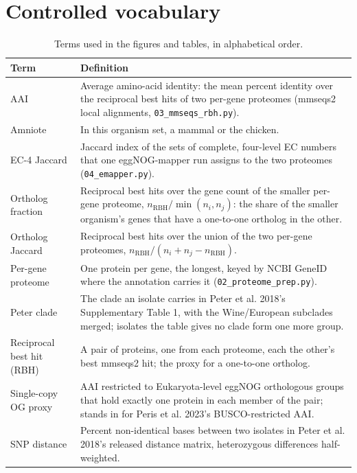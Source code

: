 
\section{Controlled vocabulary}\label{sec:vocab}

\begin{table}[H]\centering\footnotesize
\caption[]{Terms used in the figures and tables, in alphabetical order.}
\label{tab:vocab}
\begin{tabular}{@{}L{38mm} L{140mm}@{}}
\toprule
Term & Definition \\
\midrule
AAI & Average amino-acid identity: the mean percent identity over the reciprocal best hits
of two per-gene proteomes (mmseqs2 local alignments, \texttt{03\_mmseqs\_rbh.py}). \\
Amniote & In this organism set, a mammal or the chicken. \\
EC-4 Jaccard & Jaccard index of the sets of complete, four-level EC numbers that one
eggNOG-mapper run assigns to the two proteomes (\texttt{04\_emapper.py}). \\
Ortholog fraction & Reciprocal best hits over the gene count of the smaller per-gene
proteome, $n_\mathrm{RBH}/\min(n_i, n_j)$: the share of the smaller organism's genes that
have a one-to-one ortholog in the other. \\
Ortholog Jaccard & Reciprocal best hits over the union of the two per-gene proteomes,
$n_\mathrm{RBH}/(n_i + n_j - n_\mathrm{RBH})$. \\
Per-gene proteome & One protein per gene, the longest, keyed by NCBI GeneID where the
annotation carries it (\texttt{02\_proteome\_prep.py}). \\
Peter clade & The clade an isolate carries in Peter et al. 2018's Supplementary Table 1,
with the Wine/European subclades merged; isolates the table gives no clade form one more
group. \\
Reciprocal best hit (RBH) & A pair of proteins, one from each proteome, each the other's
best mmseqs2 hit; the proxy for a one-to-one ortholog. \\
Single-copy OG proxy & AAI restricted to Eukaryota-level eggNOG orthologous groups that
hold exactly one protein in each member of the pair; stands in for Peris et al. 2023's
BUSCO-restricted AAI. \\
SNP distance & Percent non-identical bases between two isolates in Peter et al. 2018's
released distance matrix, heterozygous differences half-weighted. \\
\bottomrule
\end{tabular}
\end{table}
